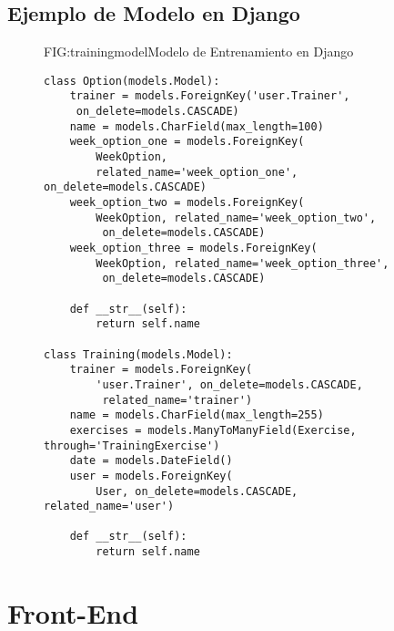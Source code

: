 \newpage

\subsection{Ejemplo de Modelo en Django}
\begin{figure}[Modelo de Entrenamiento]{FIG:trainingmodel}{Modelo de Entrenamiento en Django}
    \begin{verbatim}
class Option(models.Model):
    trainer = models.ForeignKey('user.Trainer',
     on_delete=models.CASCADE)
    name = models.CharField(max_length=100)
    week_option_one = models.ForeignKey(
        WeekOption, 
        related_name='week_option_one', on_delete=models.CASCADE)
    week_option_two = models.ForeignKey(
        WeekOption, related_name='week_option_two',
         on_delete=models.CASCADE)
    week_option_three = models.ForeignKey(
        WeekOption, related_name='week_option_three',
         on_delete=models.CASCADE)
    
    def __str__(self):
        return self.name

class Training(models.Model):
    trainer = models.ForeignKey(
        'user.Trainer', on_delete=models.CASCADE,
         related_name='trainer')
    name = models.CharField(max_length=255)
    exercises = models.ManyToManyField(Exercise, through='TrainingExercise')
    date = models.DateField()
    user = models.ForeignKey(
        User, on_delete=models.CASCADE, related_name='user')

    def __str__(self):
        return self.name
    \end{verbatim}
    \end{figure}

\newpage

\section{Front-End}

